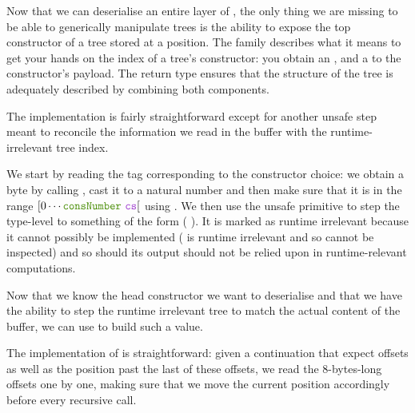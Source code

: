 
Now that we can deserialise an entire layer of ,
the only thing we are missing to be able to generically manipulate trees
is the ability to expose the top constructor of a tree stored at a
 position.
%
The  family describes what it means to get your hands on
the index of a tree's constructor: you obtain an ,
and a  to the constructor's payload.
%
The return type ensures that the structure of the tree is adequately
described by combining both components.





The implementation is fairly straightforward except for another
unsafe step meant to reconcile the information we read in the buffer
with the runtime-irrelevant tree index.


We start by reading the tag 
corresponding to the constructor choice:
we obtain a byte by calling , cast it to a
natural number and then make sure that it is in the range
$[0 \cdots \text{\IdrisFunction{consNumber} \IdrisBound{cs}}[$ using
.
%
We then use the unsafe  primitive to step the
type-level  to something of the form
( \IdrisData{\#} ).
It is marked as runtime irrelevant because it cannot possibly be
implemented ( is runtime irrelevant and so cannot be inspected)
and so should its output should not be relied upon in runtime-relevant
computations.


Now that we know the head constructor we want to deserialise and that
we have the ability to step the runtime irrelevant tree to match the
actual content of the buffer, we can use 
to build such a value.




The implementation of  is straightforward: given
a continuation that expect  offsets as well as the
position past the last of these offsets, we read the 8-bytes-long
offsets one by one, making sure that we move the current position
accordingly before every recursive call.

